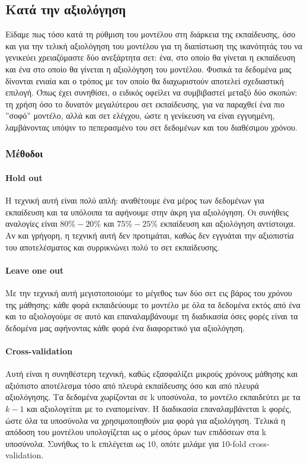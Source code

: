 \subsection{Κατά την αξιολόγηση}
Είδαμε πως τόσο κατά τη ρύθμιση του μοντέλου στη διάρκεια της εκπαίδευσης, όσο και για την τελική αξιολόγηση του μοντέλου για τη διαπίστωση της ικανότητάς του να γενικεύει χρειαζόμαστε δύο ανεξάρτητα σετ: ένα, στο οποίο θα γίνεται η εκπαίδευση και ένα στο οποίο θα γίνεται η αξιολόγηση του μοντέλου. Φυσικά τα δεδομένα μας δίνονται ενιαία και ο τρόπος με τον οποίο θα διαχωριστούν αποτελεί σχεδιαστική επιλογή. Όπως έχει συνηθίσει, ο ειδικός οφείλει να συμβιβαστεί μεταξύ δύο σκοπών: τη
χρήση όσο το δυνατόν μεγαλύτερου σετ εκπαίδευσης, για να παραχθεί ένα πιο ”σοφό” μοντέλο, αλλά και σετ ελέγχου, ώστε η γενίκευση να είναι εγγυημένη, λαμβάνοντας υπόψιν το πεπερασμένο του σετ δεδομένων και του διαθέσιμου χρόνου.
\subsubsection{Μέθοδοι} \label{section:eval}
\paragraph{Hold out} Η τεχνική αυτή είναι πολύ απλή: αναθέτουμε ένα μέρος των δεδομένων για εκπαίδευση και τα υπόλοιπα τα αφήνουμε στην άκρη για αξιολόγηση. Οι συνήθεις αναλογίες είναι $80\%-20\%$ και $75\%-25\%$ εκπαίδευση και αξιολόγηση αντίστοιχα. Αν και γρήγορη, η τεχνική αυτή δεν προτιμάται, καθώς δεν εγγυάται την αξιοπιστία του αποτελέσματος και συρρικνώνει πολύ το σετ εκπαίδευσης.
\paragraph{Leave one out} Με την τεχνική αυτή μεγιστοποιούμε το μέγεθος των δύο σετ εις βάρος του χρόνου της μάθησης: κάθε φορά εκπαιδεύουμε το μοντέλο με όλα τα δεδομένα εκτός από ένα και το αξιολογούμε σε αυτό και επαναλαμβάνουμε τη διαδικασία όσες φορές είναι τα δεδομένα μας αφήνοντας κάθε φορά ένα διαφορετικό για αξιολόγηση.
\paragraph{Cross-validation}Αυτή είναι η συνηθέστερη τεχνική, καθώς εξασφαλίζει μικρούς χρόνους μάθησης και αξιόπιστο αποτέλεσμα τόσο από πλευρά εκπαίδευσης όσο και από πλευρά αξιολόγησης. Τα δεδομένα χωρίζονται σε k υποσύνολα, το μοντέλο εκπαιδεύτει με τα $k-1$ και αξιολογείται με το εναπομείναν. Η διαδικασία επαναλαμβάνεται k φορές, ώστε όλα τα υποσύνολα να χρησιμοποιηθούν μια φορά για
αξιολόγηση. Τελικά η απόδοση του μοντέλου υπολογίζεται ως ο μέσος όρων των επιδόσεων στα k υποσύνολα. Συνήθως το k επιλέγεται ως $10$, οπότε μιλάμε για $10$-fold cross-validation. 
